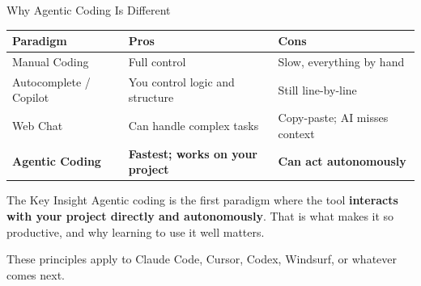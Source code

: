 \documentclass[aspectratio=169, 11pt]{beamer}
\begin{document}
\begin{frame}{Why Agentic Coding Is Different}
  \small
  \begin{tabular}{@{}l l l@{}}
    \toprule
    \textbf{Paradigm} & \textbf{Pros} & \textbf{Cons} \\
    \midrule
    Manual Coding & Full control & Slow, everything by hand \\
    Autocomplete / Copilot & You control logic and structure & Still line-by-line \\
    Web Chat & Can handle complex tasks & Copy-paste; AI misses context \\
    \textbf{Agentic Coding} & \textbf{Fastest; works on your project} & \textbf{Can act autonomously} \\
    \bottomrule
  \end{tabular}

  \vspace{0.8em}
  \begin{alertblock}{The Key Insight}
    Agentic coding is the first paradigm where the tool \textbf{interacts with your project directly and autonomously}.
    That is what makes it so productive, and why learning to use it well matters.
  \end{alertblock}

  \vspace{0.3em}
  These principles apply to Claude Code, Cursor, Codex, Windsurf, or whatever comes next.
\end{frame}
\end{document}
